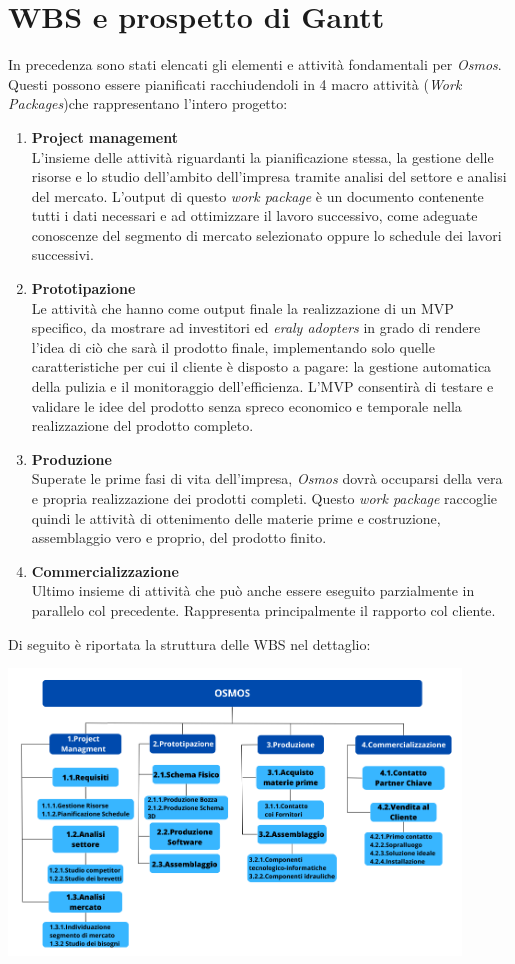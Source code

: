 \documentclass[a4paper, 12pt]{article}
\begin{document}
	\section{WBS e prospetto di Gantt}
	In precedenza sono stati elencati gli elementi e attività fondamentali per \emph{Osmos}. Questi possono essere pianificati racchiudendoli in 4 macro attività (\emph{Work Packages})che rappresentano l'intero progetto:
	\begin{enumerate}
		\item \textbf{Project management}\\
			  L'insieme delle attività riguardanti la pianificazione stessa, la gestione delle risorse e lo studio dell'ambito dell'impresa tramite analisi del settore e analisi del mercato. L'output di questo \emph{work package} è un documento contenente tutti i dati necessari e ad ottimizzare il lavoro successivo, come adeguate conoscenze del segmento di mercato selezionato oppure lo schedule dei lavori successivi.
		\item \textbf{Prototipazione}\\
			  Le attività che hanno come output finale la realizzazione di un MVP specifico, da mostrare ad investitori ed \emph{eraly adopters} in grado di rendere l'idea di ciò che sarà il prodotto finale, implementando solo quelle caratteristiche per cui il cliente è disposto a pagare: la gestione automatica della pulizia e il monitoraggio dell'efficienza. L'MVP consentirà di testare e validare le idee del prodotto senza spreco economico e temporale nella realizzazione del prodotto completo.
		\item \textbf{Produzione}\\
			  Superate le prime fasi di vita dell'impresa, \emph{Osmos} dovrà occuparsi della vera e propria realizzazione dei prodotti completi. Questo \emph{work package} raccoglie quindi le attività di ottenimento delle materie prime e costruzione, assemblaggio vero e proprio, del prodotto finito.
		\item \textbf{Commercializzazione}\\
			  Ultimo insieme di attività che può anche essere eseguito parzialmente in parallelo col precedente. Rappresenta principalmente il rapporto col cliente.
	\end{enumerate}
	Di seguito è riportata la struttura delle WBS nel dettaglio:
	\begin{center}
		\includegraphics[width=0.9\textwidth]{Images/WBS.png}
	\end{center}
\end{document}
